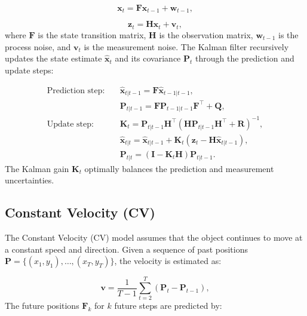 \documentclass[12pt,oneside]{book} %
\begin{document}
\begin{equation}
    \mathbf{x}_t = \mathbf{F} \mathbf{x}_{t-1} + \mathbf{w}_{t-1},
\end{equation}

\begin{equation}
    \mathbf{z}_t = \mathbf{H} \mathbf{x}_t + \mathbf{v}_t,
\end{equation}
where $\mathbf{F}$ is the state transition matrix, $\mathbf{H}$ is the
observation matrix, $\mathbf{w}_{t-1}$ is the process noise, and $\mathbf{v}_t$
is the measurement noise. The Kalman filter recursively updates the state
estimate $\hat{\mathbf{x}}_t$ and its covariance $\mathbf{P}_t$ through the
prediction and update steps:

\begin{align}
    \text{Prediction step:} & \quad \hat{\mathbf{x}}_{t|t-1} = \mathbf{F} \hat{\mathbf{x}}_{t-1|t-1},                                                                 \\
                            & \quad \mathbf{P}_{t|t-1} = \mathbf{F} \mathbf{P}_{t-1|t-1} \mathbf{F}^\top + \mathbf{Q},                                                \\
    \text{Update step:}     & \quad \mathbf{K}_t = \mathbf{P}_{t|t-1} \mathbf{H}^\top \left(\mathbf{H} \mathbf{P}_{t|t-1} \mathbf{H}^\top + \mathbf{R}\right)^{-1},   \\
                            & \quad \hat{\mathbf{x}}_{t|t} = \hat{\mathbf{x}}_{t|t-1} + \mathbf{K}_t \left(\mathbf{z}_t - \mathbf{H} \hat{\mathbf{x}}_{t|t-1}\right), \\
                            & \quad \mathbf{P}_{t|t} = \left(\mathbf{I} - \mathbf{K}_t \mathbf{H}\right) \mathbf{P}_{t|t-1}.
\end{align}
The Kalman gain $\mathbf{K}_t$ optimally balances the prediction and
measurement uncertainties.
\subsection*{Constant Velocity (CV)}
\noindent The Constant Velocity (CV) model assumes that the object continues to move at a
constant speed and direction. Given a sequence of past positions $\mathbf{P} =
    \{(x_1, y_1), \dots, (x_T, y_T)\}$, the velocity is estimated as:

\begin{equation}
    \mathbf{v} = \frac{1}{T-1} \sum_{t=2}^{T} \left(\mathbf{P}_t - \mathbf{P}_{t-1}\right),
\end{equation}
The future positions $\mathbf{F}_{k}$ for $k$ future steps are predicted by:
\end{document}
